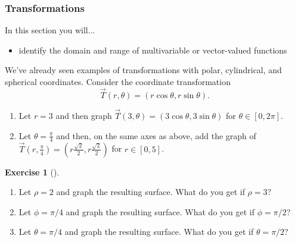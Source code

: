 \documentclass[10pt,]{book}
\theoremstyle{plain}
\theoremstyle{definition}
\theoremstyle{definition}
\theoremstyle{definition}
\theoremstyle{definition}
\newtheorem{exploration}[project]{Exercise}
\theoremstyle{definition}
\numberwithin{equation}{section}
\begin{document}
\subsubsection[{Transformations}]{Transformations}\label{subsubsection-1}
In this section you will... \leavevmode%
\begin{itemize}[label=\textbullet]
\item{}identify the domain and range of multivariable or vector-valued functions%
\end{itemize}
%
\par
We've already seen examples of transformations with polar, cylindrical, and spherical coordinates.%
Consider the coordinate transformation%
\begin{equation*}
\vec T(r,\theta) = (r\cos\theta,r\sin\theta).
\end{equation*}
\leavevmode%
\begin{enumerate}
\item\hypertarget{li-63}{}Let \(r=3\) and then graph \(\vec T(3,\theta)=(3\cos\theta,3\sin\theta)\) for \(\theta\in[0,2\pi]\).%
\item\hypertarget{li-64}{}Let \(\theta=\frac{\pi}{4}\) and then, on the same axes as above, add the graph of \(\vec T\left(r,\frac{\pi}{4}\right)=\left(r\frac{\sqrt 2}{2},r \frac{\sqrt 2}{2}\right)\) for \(r\in[0,5]\).%
\end{enumerate}
%
\begin{exploration}[]\label{graphing_spherical_coordinates}
\leavevmode%
\begin{enumerate}[font=\bfseries,label=(\alph*),ref=\alph*]
\item\label{task-237} Let \(\rho=2\) and graph the resulting surface.  What do you get if \(\rho = 3\)?%
\item\label{task-238} Let \(\phi=\pi/4\) and graph the resulting surface.  What do you get if \(\phi=\pi/2\)?%
\item\label{task-239} Let \(\theta=\pi/4\) and graph the resulting surface.  What do you get if \(\theta=\pi/2\)?%
\end{enumerate}
\end{exploration}
\typeout{************************************************}
\typeout{************************************************}
\end{document}
